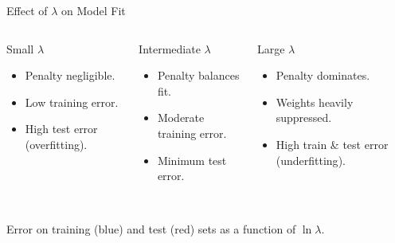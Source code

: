 \begin{frame}{Effect of $\lambda$ on Model Fit}
  \begin{columns}[T]
  \begin{alertblock}{Small $\lambda$}
    \begin{itemize}
      \item Penalty negligible.
      \item Low training error.
      \item High test error (\alert{overfitting}).
    \end{itemize}
  \end{alertblock}
  \begin{exampleblock}{Intermediate $\lambda$}
    \begin{itemize}
      \item Penalty balances fit.
      \item Moderate training error.
      \item \alert{Minimum test error.}
    \end{itemize}
  \end{exampleblock}
  \begin{alertblock}{Large $\lambda$}
    \begin{itemize}
      \item Penalty dominates.
      \item Weights heavily suppressed.
      \item High train \& test error (\alert{underfitting}).
    \end{itemize}
  \end{alertblock}
  \end{columns}
  \vspace{.5em}
  \begin{center}
  \\
  {\small Error on training (blue) and test (red) sets as a function of $\ln\lambda$.}
  \end{center}
\end{frame}


